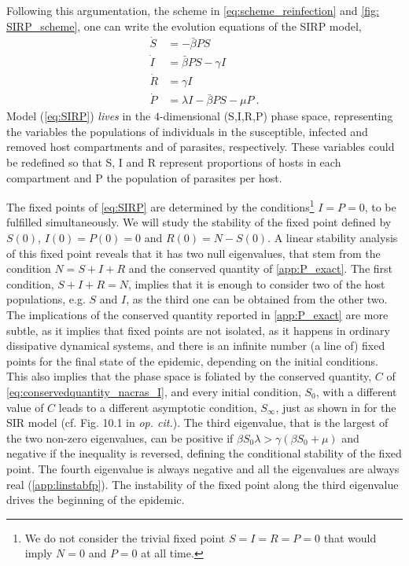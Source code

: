 Following this argumentation, the scheme in \cref{eq:scheme_reinfection}
and \cref{fig: SIRP_scheme}, one can write the evolution equations of the SIRP
model,
\begin{equation}\label{eq:SIRP}
    \begin{aligned}
        \dot{S} & =-\bar{\beta} P S                    \\
        \dot{I} & =\bar{\beta} P S-\gamma I            \\
        \dot{R} & =\gamma I                            \\
        \dot{P} & =\lambda I-\bar{\beta} P S-\mu P \ .
    \end{aligned}
\end{equation}
Model (\cref{eq:SIRP})	\textit{lives} in the $4$-dimensional (S,I,R,P)
phase space, representing the variables
the populations of individuals in the susceptible, infected and removed
host compartments and of parasites, respectively. These variables could be
redefined so that S, I and R represent proportions of hosts in each compartment
and P the population of parasites per host.

The fixed points of \cref{eq:SIRP} are determined by the
conditions\footnote{We do not consider the trivial fixed point $S=I=R=P=0$ that
    would imply $N=0$ and $P=0$ at all time.}
$I=P=0$, to be fulfilled simultaneously.
We will study the stability of the fixed point defined by $S(0)$,
$I(0)=P(0)=0$ and $R(0)=N-S(0)$.
A linear stability analysis of this fixed point reveals that it has two
null eigenvalues, that stem from the condition $N=S+I+R$ and the conserved
quantity of \cref{app:P_exact}.
The first condition, $S+I+R=N$, implies that it is enough to consider two
of the host populations, e.g. $S$ and $I$, as the third one can be obtained
from the other two. The implications of the conserved quantity reported in
\cref{app:P_exact} are more subtle, as it implies that fixed points are not
isolated, as it happens in ordinary dissipative dynamical systems, and there is
an infinite number (a line of) fixed points for the final state of the
epidemic, depending on the initial conditions. This also implies that the phase
space is foliated by the conserved quantity, $C$ of
\cref{eq:conservedquantity_nacras_I}, and every initial condition, $S_0$, with
a
different value of $C$ leads to a different asymptotic condition, $S_{\infty}$,
just as shown in \cite{Murray_book} for the SIR model (cf. Fig. 10.1 in
\textit{op. cit.}).
The third eigenvalue, that is the largest of the two non-zero eigenvalues,
can be positive if $\beta S_0 \lambda>\gamma(\beta S_0+\mu)$ and negative if
the inequality is reversed, defining the conditional stability of the fixed
point. The fourth eigenvalue is always negative and all the eigenvalues are
always real (\cref{app:linstabfp}).
The instability of the fixed point along the third eigenvalue drives the
beginning of the epidemic.

